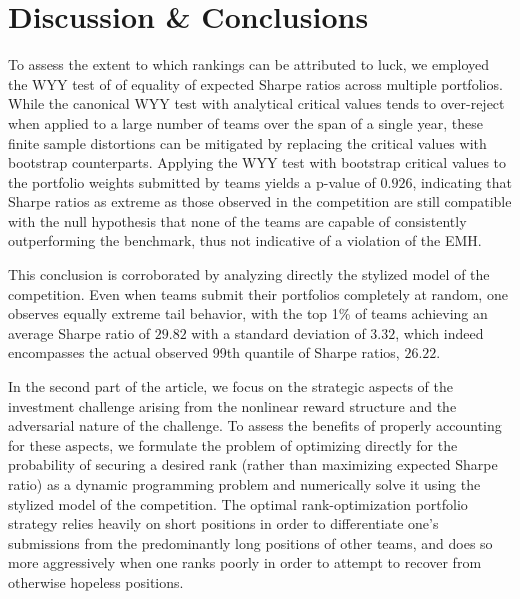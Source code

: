 \documentclass[3p,times,twocolumn]{elsarticle}
\begin{document}
\section{Discussion \& Conclusions}\label{section:conclusions}


To assess the extent to which rankings can be attributed to luck, we employed the WYY test of \citet{wrightTestEqualityMultiple2014} of equality of expected Sharpe ratios across multiple portfolios. 
While the canonical WYY test with analytical critical values tends to over-reject when applied to a large number of teams over the span of a single year, these finite sample distortions can be mitigated by replacing the critical values with bootstrap counterparts.
Applying the WYY test with bootstrap critical values to the portfolio weights submitted by teams yields a p-value of $0.926$, indicating that Sharpe ratios as extreme as those observed in the competition are still compatible with the null hypothesis that none of the teams are capable of consistently outperforming the benchmark, thus not indicative of a violation of the EMH.

This conclusion is corroborated by analyzing directly the stylized model of the competition.
Even when teams submit their portfolios completely at random, one observes equally extreme tail behavior, with the top 1\% of teams achieving an average Sharpe ratio of $29.82$ with a standard deviation of $3.32$, which indeed encompasses the actual observed 99th quantile of Sharpe ratios, $26.22$.

In the second part of the article, we focus on the strategic aspects of the investment challenge arising from the nonlinear reward structure and the adversarial nature of the challenge. 
To assess the benefits of properly accounting for these aspects, we formulate the problem of optimizing directly for the probability of securing a desired rank (rather than maximizing expected Sharpe ratio) as a dynamic programming problem and numerically solve it using the stylized model of the competition.
The optimal rank-optimization portfolio strategy relies heavily on short positions in order to differentiate one's submissions from the predominantly long positions of other teams, and does so more aggressively when one ranks poorly in order to attempt to recover from otherwise hopeless positions.
\end{document}

